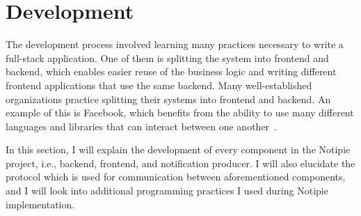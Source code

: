 \section{Development}\label{sec:development}

The development process involved learning many practices
necessary to write a full-stack application.
One of them is splitting the system
into frontend and backend,
which enables easier reuse of the business logic
and writing different frontend applications
that use the same backend.
Many well-established organizations practice splitting
their systems into frontend and backend.
An example of this is Facebook,
which benefits from the ability to use
many different languages and libraries
that can interact between one another~\cite{abdullah_frontend_2014}.

In this section,
I will explain the development of every component
in the Notipie project, i.e.,
backend,
frontend, and
notification producer.
I will also elucidate the protocol
which is used for communication between aforementioned components,
and I will look into additional programming practices
I used during Notipie implementation.






